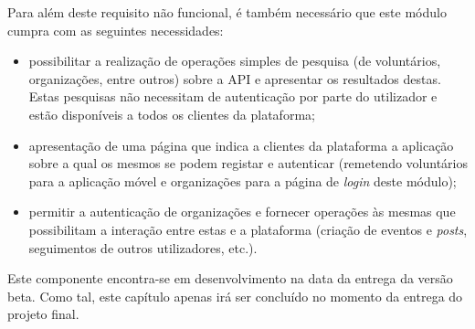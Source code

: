 Para além deste requisito não funcional, é também necessário que este módulo cumpra com as seguintes necessidades:

\begin{itemize}
	\item possibilitar a realização de operações simples de pesquisa (de voluntários, organizações, entre outros) sobre a API e apresentar os resultados destas. Estas pesquisas não necessitam de autenticação por parte do utilizador e estão disponíveis a todos os clientes da plataforma;
	\item apresentação de uma página que indica a clientes da plataforma a aplicação sobre a qual os mesmos se podem registar e autenticar (remetendo voluntários para a aplicação móvel e organizações para a página de \textit{login} deste módulo);
	\item permitir a autenticação de organizações e fornecer operações às mesmas que possibilitam a interação entre estas e a plataforma (criação de eventos e \textit{posts}, seguimentos de outros utilizadores, etc.).
\end{itemize}

\bigskip \bigskip

Este componente encontra-se em desenvolvimento na data da entrega da versão beta. Como tal, este capítulo apenas irá ser concluído no momento da entrega do projeto final.